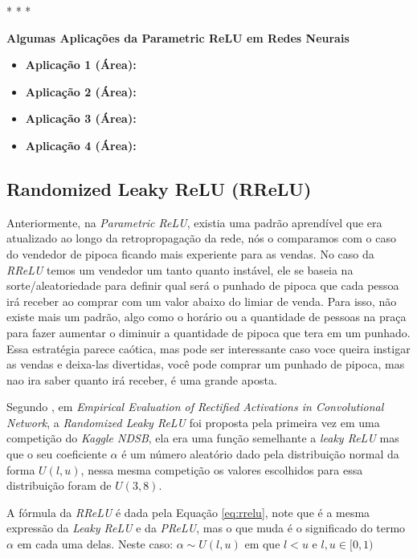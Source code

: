 \medskip
\begin{center}
 * * *
\end{center}
\medskip

\textbf{Algumas Aplicações da Parametric ReLU em Redes Neurais}
\vspace{1em}

\begin{itemize}
    \item \textbf{Aplicação 1 (Área):}
    \item \textbf{Aplicação 2 (Área):}
    \item \textbf{Aplicação 3 (Área):}
    \item \textbf{Aplicação 4 (Área):}
\end{itemize}

\subsection{Randomized Leaky ReLU (RReLU)}

Anteriormente, na \textit{Parametric ReLU}, existia uma padrão aprendível que era atualizado ao longo da retropropagação da rede, nós o comparamos com o caso do vendedor de pipoca ficando mais experiente para as vendas. No caso da \textit{RReLU} temos um vendedor um tanto quanto instável, ele se baseia na sorte/aleatoriedade para definir qual será o punhado de pipoca que cada pessoa irá receber ao comprar com um valor abaixo do limiar de venda. Para isso, não existe mais um padrão, algo como o horário ou a quantidade de pessoas na praça para fazer aumentar o diminuir a quantidade de pipoca que tera em um punhado. Essa estratégia parece caótica, mas pode ser interessante caso voce queira instigar as vendas e deixa-las divertidas, você pode comprar um punhado de pipoca, mas nao ira saber quanto irá receber, é uma grande aposta.

Segundo \textcite{XuRReLU}, em \textit{Empirical Evaluation of Rectified Activations in Convolutional Network}, a \textit{Randomized Leaky ReLU} foi proposta pela primeira vez em uma competição do \textit{Kaggle NDSB}, ela era uma função semelhante a \textit{leaky ReLU} mas que o seu coeficiente $\alpha$ é um número aleatório dado pela distribuição normal da forma $U(l, u)$, nessa mesma competição os valores escolhidos para essa distribuição foram de $U(3, 8)$.

A fórmula da \textit{RReLU} é dada pela Equação \ref{eq:rrelu}, note que é a mesma expressão da \textit{Leaky ReLU} e da \textit{PReLU}, mas o que muda é o significado do termo $\alpha$ em cada uma delas. Neste caso: $\alpha \sim U (l, u)$ em que $l < u$  e $l, u \in [0, 1)$ 


